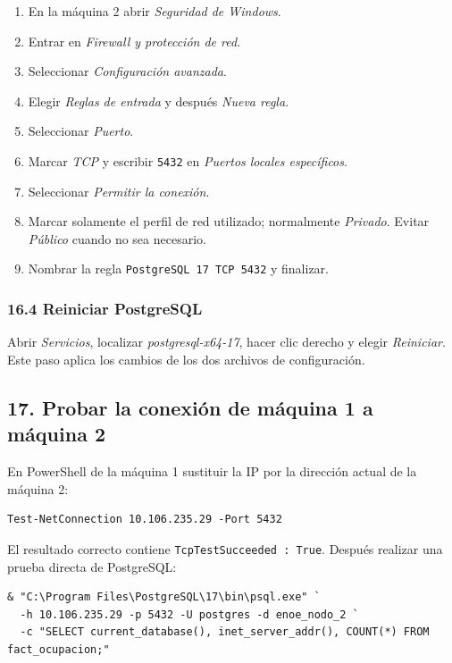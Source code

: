\documentclass[12pt,letterpaper]{article}
\begin{document}
\begin{enumerate}
  \item En la máquina 2 abrir \textit{Seguridad de Windows}.
  \item Entrar en \textit{Firewall y protección de red}.
  \item Seleccionar \textit{Configuración avanzada}.
  \item Elegir \textit{Reglas de entrada} y después \textit{Nueva regla}.
  \item Seleccionar \textit{Puerto}.
  \item Marcar \textit{TCP} y escribir \texttt{5432} en
        \textit{Puertos locales específicos}.
  \item Seleccionar \textit{Permitir la conexión}.
  \item Marcar solamente el perfil de red utilizado; normalmente
        \textit{Privado}. Evitar \textit{Público} cuando no sea necesario.
  \item Nombrar la regla \texttt{PostgreSQL 17 TCP 5432} y finalizar.
\end{enumerate}

\subsubsection{16.4 Reiniciar PostgreSQL}

Abrir \textit{Servicios}, localizar \textit{postgresql-x64-17}, hacer clic
derecho y elegir \textit{Reiniciar}. Este paso aplica los cambios de los dos
archivos de configuración.

\subsection{17. Probar la conexión de máquina 1 a máquina 2}

En PowerShell de la máquina 1 sustituir la IP por la dirección actual de la
máquina 2:

\begin{lstlisting}
Test-NetConnection 10.106.235.29 -Port 5432
\end{lstlisting}

El resultado correcto contiene \texttt{TcpTestSucceeded : True}. Después
realizar una prueba directa de PostgreSQL:

\begin{lstlisting}
& "C:\Program Files\PostgreSQL\17\bin\psql.exe" `
  -h 10.106.235.29 -p 5432 -U postgres -d enoe_nodo_2 `
  -c "SELECT current_database(), inet_server_addr(), COUNT(*) FROM fact_ocupacion;"
\end{lstlisting}
\end{document}
